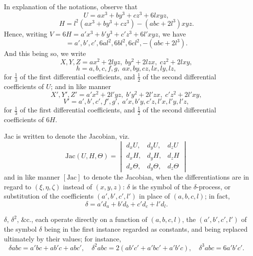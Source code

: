 \documentclass[11pt,a4paper]{article}
\begin{document}
In explanation of the notations, observe that
\[
  U = ax^{3}+by^{3}+cz^{3}+6lxyz,
\]
\[
  H = l^{2}(ax^{3}+by^{3}+cz^{3})-(abc+2l^{3})xyz.
\]
Hence, writing $V=6H=a'x^{3}+b'y^{3}+c'z^{3}+6l'xyz$, we have
\[
  =a',b',c',6al^{2},6bl^{2},6cl^{2},-(abc+2l^{3}).
\]
And this being so, we write
\[
  X,Y,Z = ax^{2}+2lyz,\;by^{2}+2lzx,\;cz^{2}+2lxy,
\]
\[
  h = a,b,c,f,g,\;ax,by,cz,lx,ly,lz,
\]
for $\tfrac{1}{3}$ of the first differential coefficients, and
$\tfrac{1}{2}$ of the second differential coefficients of $U$; and in
like manner
\[
  X',Y',Z' = a'x^{2}+2l'yz,\;b'y^{2}+2l'zx,\;c'z^{2}+2l'xy,
\]
\[
  V'=a',b',c',f',g',\;a'x,b'y,c'z,l'x,l'y,l'z,
\]
for $\tfrac{1}{3}$ of the first differential coefficients, and
$\tfrac{1}{2}$ of the second differential coefficients of $6H$.

Jac is written to denote the Jacobian, viz.
\[
  \mathrm{Jac}(U,H,\Theta)=\begin{vmatrix} d_{x}U,&d_{y}U,&d_{z}U\\ d_{x}H,&d_{y}H,&d_{z}H\\ d_{x}\Theta,&d_{y}\Theta,&d_{z}\Theta \end{vmatrix}
\]
and in like manner $[\mathrm{Jac}]$ to denote the Jacobian, when the
differentiations are in regard to $(\xi,\eta,\zeta)$ instead of
$(x,y,z)$: $\delta$ is the symbol of the $\delta$-process, or
substitution of the coefficients $(a',b',c',l')$ in place of
$(a,b,c,l)$; in fact,
\[
  \delta = a'd_{a}+b'd_{b}+c'd_{c}+l'd_{l}.
\]

$\delta$, $\delta^{2}$, \&c., each operate directly on a function of
$(a,b,c,l)$, the $(a',b',c',l')$ of the symbol $\delta$ being in the
first instance regarded as constants, and being replaced ultimately by
their values; for instance,
\[
  \delta abc = a'bc+ab'c+abc',\quad \delta^{2}abc=2(ab'c'+a'bc'+a'b'c),\quad \delta^{3}abc=6a'b'c'.
\]
\end{document}
